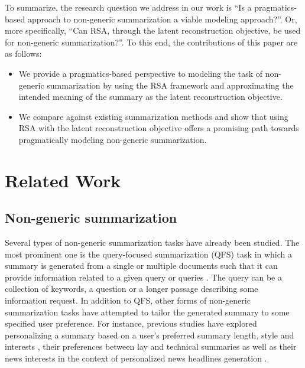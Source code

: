 \documentclass[11pt]{article}
\begin{document}
To summarize, the research question we address in our work is ``Is a pragmatics-based approach to non-generic summarization a viable modeling approach?''. Or, more specifically, ``Can RSA, through the latent reconstruction objective, be used for non-generic summarization?''. To this end, the contributions of this paper are as follows:

\begin{itemize}
    \item We provide a pragmatics-based perspective to modeling the task of non-generic summarization by using the RSA framework and approximating the intended meaning of the summary as the latent reconstruction objective.
    \item We compare against existing summarization methods and show that using RSA with the latent reconstruction objective offers a promising path towards pragmatically modeling non-generic summarization.
\end{itemize}

%

\section{Related Work}

\subsection{Non-generic summarization}

Several types of non-generic summarization tasks have already been studied. The most prominent one is the query-focused summarization (QFS) task in which a summary is generated from a single or multiple documents such that it can provide information related to a given query or queries \citep{dangDUC2005Evaluation2006,daumeBayesianQueryfocusedSummarization2006,suCAiRECOVIDQuestionAnswering2020,xuCoarsetoFineQueryFocused2020}. The query can be a collection of keywords, a question or a longer passage describing some information request. In addition to QFS, other forms of non-generic summarization tasks have attempted to tailor the generated summary to some specified user preference. For instance, previous studies have explored personalizing a summary based on a user's preferred summary length, style and interests \citep{fanControllableAbstractiveSummarization2018}, their preferences between lay and technical summaries \citep{tauchmannGenericSummarizationMultifaceted2018,shaibSummarizingSimplifyingSynthesizing2023a} as well as their news interests in the context of personalized news headlines generation \citep{aoPENSDatasetGeneric2021}.
\end{document}
